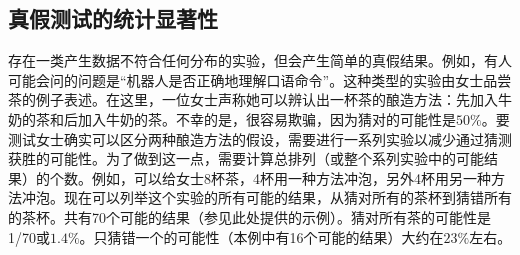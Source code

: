 
\subsection {真假测试的统计显著性}
存在一类产生数据不符合任何分布的实验，但会产生简单的真假结果。例如，有人可能会问的问题是“机器人是否正确地理解口语命令”。这种类型的实验由女士品尝茶的例子表述。在这里，一位女士声称她可以辨认出一杯茶的酿造方法：先加入牛奶的茶和后加入牛奶的茶。不幸的是，很容易欺骗，因为猜对的可能性是$50\%$。要测试女士确实可以区分两种酿造方法的假设，需要进行一系列实验以减少通过猜测获胜的可能性。为了做到这一点，需要计算总排列（或整个系列实验中的可能结果）的个数。例如，可以给女士8杯茶，4杯用一种方法冲泡，另外4杯用另一种方法冲泡。现在可以列举这个实验的所有可能的结果，从猜对所有的茶杯到猜错所有的茶杯。共有70个可能的结果（参见此处提供的示例）。猜对所有茶的可能性是1/70或$1.4\%$。只猜错一个的可能性（本例中有16个可能的结果）大约在$23\%$左右。

